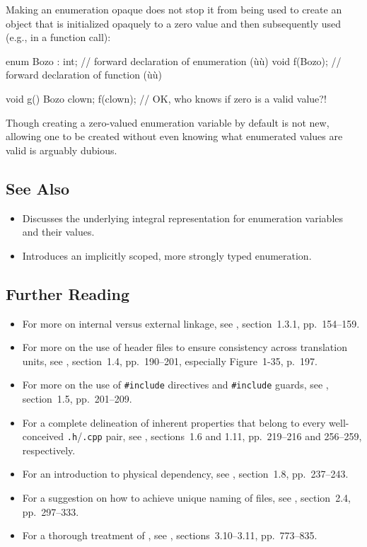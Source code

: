 Making an enumeration opaque does not stop it from being used to create
an object that is initialized opaquely to a zero value and then
subsequently used (e.g., in a function call):

\begin{emcppslisting}
enum Bozo : int;  // forward declaration of enumeration (ù{}ù)
void f(Bozo);     // forward declaration of function (ù{}ù)

void g()
{
    Bozo clown{};
    f(clown);      // OK, who knows if zero is a valid value?!
}
\end{emcppslisting}

\noindent Though creating a zero-valued enumeration variable by default is not
new, allowing one to be created without even knowing what enumerated
values are valid is arguably dubious.

\subsection[See Also]{See Also}\label{see-also}

\begin{itemize}
\item{Discusses the underlying integral representation for enumeration variables and their values.}
\item{Introduces an implicitly scoped, more strongly typed enumeration.}
\end{itemize}

\subsection[Further Reading]{Further Reading}\label{further-reading}

\begin{itemize}
\item{For more on internal versus external linkage, see \cite{lakos20}, section~1.3.1, pp.~154--159.}
\item{For more on the use of header files to ensure consistency across translation units, see \cite{lakos20}, section~1.4, pp.~190--201, especially Figure~1-35, p.~197.}
\item{For more on the use of \lstinline!#include! directives and \lstinline!#include! guards, see \cite{lakos20}, section~1.5, pp.~201--209.}
\item{For a complete delineation of inherent properties that belong to every well-conceived \lstinline!.h!/\lstinline!.cpp! pair, see \cite{lakos20}, sections~1.6 and 1.11, pp.~219--216 and 256--259, respectively.}
\item{For an introduction to physical dependency, see \cite{lakos20}, section~1.8, pp.~237--243.}
\item{For a suggestion on how to achieve unique naming of files, see \cite{lakos20}, section~2.4, pp.~297--333.}
\item{For a thorough treatment of , see \cite{lakos20}, sections~3.10--3.11, pp.~773--835.}
\end{itemize}

